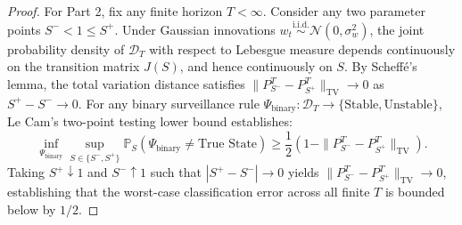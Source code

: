 \documentclass[12pt]{article}
\theoremstyle{definition}
\theoremstyle{remark}
\begin{document}
\begin{proof}
For Part 2, fix any finite horizon $T < \infty$. Consider any two parameter points $S^- < 1 \le S^+$. Under Gaussian innovations $w_t \stackrel{\text{i.i.d.}}{\sim} \mathcal{N}(0, \sigma_w^2)$, the joint probability density of $\mathcal{D}_T$ with respect to Lebesgue measure depends continuously on the transition matrix $J(S)$, and hence continuously on $S$. By Scheff\'{e}'s lemma, the total variation distance satisfies $\|P_{S^-}^T - P_{S^+}^T\|_{\text{TV}} \to 0$ as $S^+ - S^- \to 0$. For any binary surveillance rule $\Psi_{\text{binary}}: \mathcal{D}_T \to \{\text{Stable}, \text{Unstable}\}$, Le Cam's two-point testing lower bound establishes:
\begin{equation}
\inf_{\Psi_{\text{binary}}} \sup_{S \in \{S^-, S^+\}} \mathbb{P}_S(\Psi_{\text{binary}} \neq \text{True State}) \ge \frac{1}{2}\left(1 - \|P_{S^-}^T - P_{S^+}^T\|_{\text{TV}}\right).
\end{equation}
Taking $S^+ \downarrow 1$ and $S^- \uparrow 1$ such that $|S^+ - S^-| \to 0$ yields $\|P_{S^-}^T - P_{S^+}^T\|_{\text{TV}} \to 0$, establishing that the worst-case classification error across all finite $T$ is bounded below by $1/2$.
\end{proof}
\end{document}
